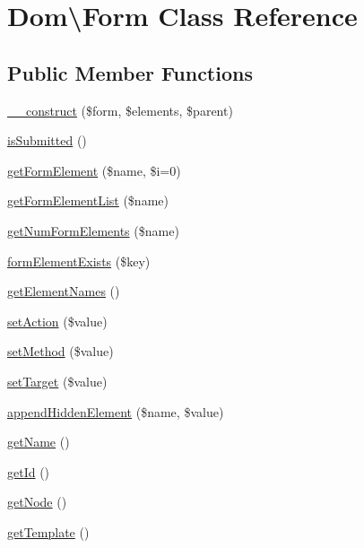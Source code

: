 \hypertarget{classDom_1_1Form}{\section{Dom\textbackslash{}Form Class Reference}
\label{classDom_1_1Form}
}
\subsection*{Public Member Functions}
\begin{DoxyCompactItemize}
\item 
\hyperlink{classDom_1_1Form_a65e0888bc892af6518bef66f4478493f}{\+\_\+\+\_\+construct} (\$form, \$elements, \$parent)
\item 
\hyperlink{classDom_1_1Form_a6a3f04acb0a15057b191288856e32988}{is\+Submitted} ()
\item 
\hyperlink{classDom_1_1Form_a7dcc534e1500c9cbb1917b94960725b7}{get\+Form\+Element} (\$name, \$i=0)
\item 
\hyperlink{classDom_1_1Form_a26a92a24ca4f392489a362d4dd7c832b}{get\+Form\+Element\+List} (\$name)
\item 
\hyperlink{classDom_1_1Form_aae8f3dfcb80c15e2d146d69284d4bf21}{get\+Num\+Form\+Elements} (\$name)
\item 
\hyperlink{classDom_1_1Form_a012cd2a2f66f327b0d612cee92c0f0d7}{form\+Element\+Exists} (\$key)
\item 
\hyperlink{classDom_1_1Form_a025318e2647c2104a05c988dd60375bc}{get\+Element\+Names} ()
\item 
\hyperlink{classDom_1_1Form_aa753a68f4a318cee9ff7597789b257a5}{set\+Action} (\$value)
\item 
\hyperlink{classDom_1_1Form_a57fa48ce5b5698514510998a348ed0ba}{set\+Method} (\$value)
\item 
\hyperlink{classDom_1_1Form_aae7371f8752cd97d1d4f5e58c5c0a6b2}{set\+Target} (\$value)
\item 
\hyperlink{classDom_1_1Form_a6da827a320f7f556ec1fc5bc75fbfa86}{append\+Hidden\+Element} (\$name, \$value)
\item 
\hyperlink{classDom_1_1Form_a8a96c65e40603aab1bc2342363a252e9}{get\+Name} ()
\item 
\hyperlink{classDom_1_1Form_a2d10dcb8fba24faacbe7f64ed2b9da47}{get\+Id} ()
\item 
\hyperlink{classDom_1_1Form_a6765bb1f7b8060355440c98c433731d7}{get\+Node} ()
\item 
\hyperlink{classDom_1_1Form_a5435b6a3041204ce9825a1c5e00c58a7}{get\+Template} ()
\end{DoxyCompactItemize}
